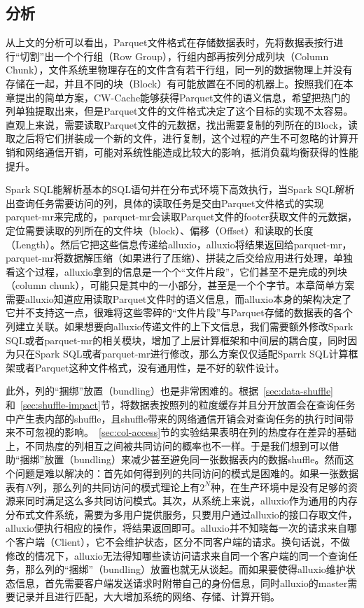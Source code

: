 \subsection{分析}

\par 从上文的分析可以看出，Parquet文件格式在存储数据表时，先将数据表按行进行“切割”出一个个行组（Row Group），行组内部再按列分成列块（Column Chunk），文件系统里物理存在的文件含有若干行组，同一列的数据物理上并没有存储在一起，并且不同的块（Block）有可能放置在不同的机器上。按照我们在本章提出的简单方案，CW-Cache能够获得Parquet文件的语义信息，希望把热门的列单独提取出来，但是Parquet文件的文件格式决定了这个目标的实现不太容易。直观上来说，需要读取Parquet文件的元数据，找出需要复制的列所在的Block，读取之后将它们拼装成一个新的文件，进行复制，这个过程的产生不可忽略的计算开销和网络通信开销，可能对系统性能造成比较大的影响，抵消负载均衡获得的性能提升。

\par Spark SQL能解析基本的SQL语句并在分布式环境下高效执行，当Spark SQL解析出查询任务需要访问的列，具体的读取任务是交由Parquet文件格式的实现parquet-mr\cite{parquet-mr}来完成的，parquet-mr会读取Parquet文件的footer获取文件的元数据，定位需要读取的列所在的文件块（block）、偏移（Offset）和读取的长度（Length）。然后它把这些信息传递给alluxio，alluxio将结果返回给parquet-mr，parquet-mr将数据解压缩（如果进行了压缩）、拼装之后交给应用进行处理，单独看这个过程，alluxio拿到的信息是一个个“文件片段”，它们甚至不是完成的列块（column chunk），可能只是其中的一小部分，甚至是一个个字节。本章简单方案需要alluxio知道应用读取Parquet文件时的语义信息，而alluxio本身的架构决定了它并不支持这一点，很难将这些零碎的“文件片段”与Parquet存储的数据表的各个列建立关联。如果想要向alluxio传递文件的上下文信息，我们需要额外修改Spark SQL或者parquet-mr的相关模块，增加了上层计算框架和中间层的耦合度，同时因为只在Spark SQL或者parquet-mr进行修改，那么方案仅仅适配Sparrk SQL计算框架或者Parquet这种文件格式，没有通用性，是不好的软件设计。

\par 此外，列的“捆绑”放置（bundling）也是非常困难的。根据~\ref{sec:data-shuffle}和~\ref{sec:shuffle-impact}节，将数据表按照列的粒度缓存并且分开放置会在查询任务中产生表内部的shuffle，且shuffle带来的网络通信开销会对查询任务的执行时间带来不可忽视的影响。~\ref{sec:col-access}节的实验结果表明在列的热度存在差异的基础上，不同热度的列相互之间被共同访问的概率也不一样。于是我们想到可以借助“捆绑”放置（bundling）来减少甚至避免同一张数据表内的数据shuffle。然而这个问题是难以解决的：首先如何得到列的共同访问的模式是困难的。如果一张数据表有$N$列，那么列的共同访问的模式理论上有$2^N$种，在生产环境中是没有足够的资源来同时满足这么多共同访问模式。其次，从系统上来说，alluxio作为通用的内存分布式文件系统，需要为多用户提供服务，只要用户通过alluxio的接口存取文件，alluxio便执行相应的操作，将结果返回即可。alluxio并不知晓每一次的请求来自哪个客户端（Client），它不会维护状态，区分不同客户端的请求。换句话说，不做修改的情况下，alluxio无法得知哪些读访问请求来自同一个客户端的同一个查询任务，那么列的“捆绑”（bundling）放置也就无从谈起。而如果要使得alluxio维护状态信息，首先需要客户端发送请求时附带自己的身份信息，同时alluxio的master需要记录并且进行匹配，大大增加系统的网络、存储、计算开销。


